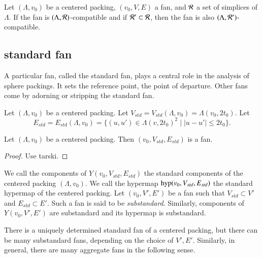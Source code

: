\begin{lemma}
Let $(\Lambda,v_0)$ be a centered packing, $(v_0,V,E)$ a fan, and ${\mathcal R}$ a set of simplices of $\Lambda$.
If the fan is $(\Lambda,{\mathcal R})$-compatible and if
 ${\mathcal R}'\subset{\mathcal R}$, then the fan is also $(\Lambda,{\mathcal R}')$-compatible.
\end{lemma}

\subsection{standard fan}

A particular fan, called the standard fan, 
plays a central role in the analysis of
sphere packings.  It  sets  the reference point, the point
of departure.  Other fans come by adorning  or stripping the
standard fan.


\begin{definition}
Let $(\Lambda,v_0)$ be a centered packing.  
Let $V_{std}=V_{std}(\Lambda,v_0)=\Lambda(v_0,2t_0)$.
Let 
$$E_{std} = E_{std}(\Lambda,v_0) = \{(u,u')\in \Lambda(v,2t_0)^2 \mid |u-u'|\le 2t_0\}.
$$
\end{definition}


\begin{lemma}
Let $(\Lambda,v_0)$ be a centered packing.  
Then $(v_0,V_{std},E_{std})$ is a fan.
\end{lemma}

\begin{proof}
Use tarski.
\end{proof}

\begin{definition}  
We call the
components of $Y(v_0,V_{std},E_{std})$ the standard components of the centered
packing $(\Lambda,v_0)$.  We call the hypermap ${\operatorname{hyp}}(v_0,V_{std},E_{std})$
the standard hypermap of the centered packing.  
Let $(v_0,V',E')$ be a fan such that $V_{std}\subset V'$ and
$E_{std}\subset E'$.  Such a fan is said to be {\it substandard}.
Similarly,  components of $Y(v_0,V',E')$ are substandard and
its hypermap is substandard.
\end{definition}

There is a uniquely determined standard fan of a centered packing,
but there can be many substandard fans, depending on the choice
of $V',E'$.  Similarly, in general, there are many aggregate fans
in the following sense.  

